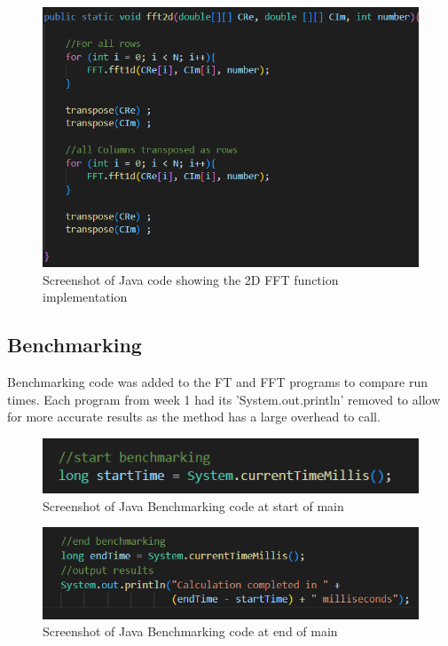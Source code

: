     \begin{figure}[H] 
        \centering
        \includegraphics[width=0.8\columnwidth]{Figures/Week 2/2dFFT Implementation.png}
        \caption{Screenshot of Java code showing the 2D FFT function implementation}
        \label{fig:2dFFT-code}
    \end{figure}


\subsection{Benchmarking}
Benchmarking code was added to the FT and FFT programs to compare run times. Each program from week 1 had its 'System.out.println' removed to allow for more accurate results as the method has a large overhead to call.


    \begin{figure}[H] 
        \centering
        \includegraphics[width=0.8\columnwidth]{Figures/Week 2/Bench code Start.png}
        \caption{Screenshot of Java Benchmarking code at start of main}
        \label{fig:bench-code-start}
    \end{figure}
    
    \begin{figure}[H] 
        \centering
        \includegraphics[width=0.8\columnwidth]{Figures/Week 2/Bench code end.png}
        \caption{Screenshot of Java Benchmarking code at end of main}
        \label{fig:bench-code-end}
    \end{figure}




